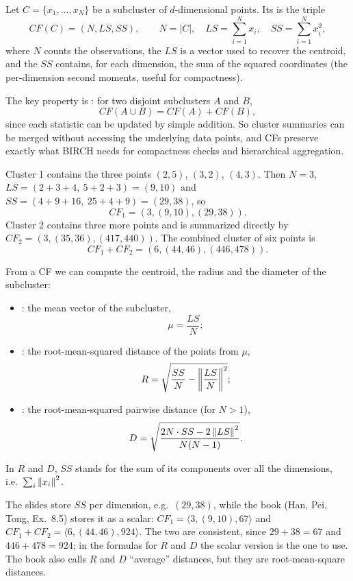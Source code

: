 \begin{definition}
Let $C = \{x_1, \dots, x_N\}$ be a subcluster of $d$-dimensional points. Its  is the triple
\[
CF(C) = (N, LS, SS), \qquad N = |C|, \quad LS = \sum_{i=1}^{N} x_i, \quad SS = \sum_{i=1}^{N} x_i^2,
\]
where $N$ counts the observations, the  $LS$ is a vector used to recover the centroid, and the  $SS$ contains, for each dimension, the sum of the squared coordinates (the per-dimension second moments, useful for compactness).
\end{definition}

The key property is : for two disjoint subclusters $A$ and $B$,
\[
CF(A \cup B) = CF(A) + CF(B),
\]
since each statistic can be updated by simple addition. So cluster summaries can be merged without accessing the underlying data points, and CFs preserve exactly what BIRCH needs for compactness checks and hierarchical aggregation.

\begin{example}
Cluster 1 contains the three points $(2,5)$, $(3,2)$, $(4,3)$. Then $N = 3$, $LS = (2+3+4,\ 5+2+3) = (9,10)$ and $SS = (4+9+16,\ 25+4+9) = (29,38)$, so
\[
CF_1 = (3, (9,10), (29,38)).
\]
Cluster 2 contains three more points and is summarized directly by $CF_2 = (3, (35,36), (417,440))$. The combined cluster of six points is
\[
CF_1 + CF_2 = (6, (44,46), (446,478)).
\]
\end{example}

From a CF we can compute the centroid, the radius and the diameter of the subcluster:
\begin{itemize}
  \item {}: the mean vector of the subcluster,
  \[
  \mu = \frac{LS}{N};
  \]
  \item {}: the root-mean-squared distance of the points from $\mu$,
  \[
  R = \sqrt{\frac{SS}{N} - \left\lVert \frac{LS}{N} \right\rVert^2};
  \]
  \item {}: the root-mean-squared pairwise distance (for $N > 1$),
  \[
  D = \sqrt{\frac{2N \cdot SS - 2\left\lVert LS \right\rVert^2}{N(N-1)}}.
  \]
\end{itemize}
In $R$ and $D$, $SS$ stands for the sum of its components over all the dimensions, i.e.\ $\sum_i \left\lVert x_i \right\rVert^2$.

\begin{remark}
The slides store $SS$ per dimension, e.g.\ $(29,38)$, while the book (Han, Pei, Tong, Ex.~8.5) stores it as a scalar: $CF_1 = \langle 3, (9,10), 67 \rangle$ and $CF_1 + CF_2 = \langle 6, (44,46), 924 \rangle$. The two are consistent, since $29 + 38 = 67$ and $446 + 478 = 924$; in the formulas for $R$ and $D$ the scalar version is the one to use. The book also calls $R$ and $D$ ``average'' distances, but they are root-mean-square distances.
\end{remark}

